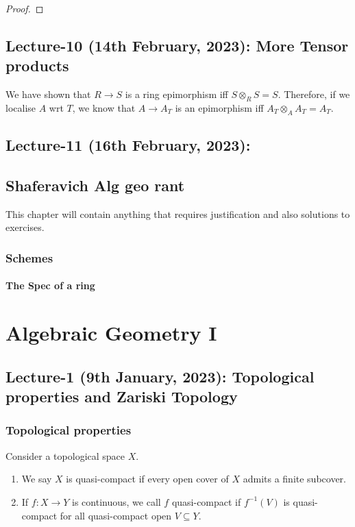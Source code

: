 \documentclass[oneside, 12pt]{scrbook}
\theoremstyle{theorem}
\begin{document}
\begin{proof}

\end{proof}

\chapter{Lecture-10 (14th February, 2023): More Tensor products}

We have shown that $R \rightarrow S$ is a ring epimorphism iff $S \otimes_{R} S = S$. Therefore, if we localise $A$ wrt $T$, we know that $A\rightarrow A_{T}$ is an epimorphism iff $A_{T} \otimes_{A} A_{T} = A_{T}$. 



\chapter{Lecture-11 (16th February, 2023): }





\chapter{Shaferavich Alg geo rant}
This chapter will contain anything that requires justification and also solutions to exercises. 
\section{Schemes}
\subsection{The Spec of a ring}





\part{Algebraic Geometry I}

\chapter{Lecture-1 (9th January, 2023): Topological properties and Zariski Topology}
\section{Topological properties}

Consider a topological space $X$. 
\begin{definition}
\begin{enumerate}
\item We say $X$ is quasi-compact if every open cover of $X$ admits a finite subcover. 
\item If $f: X \rightarrow Y$ is continuous, we call $f$ quasi-compact if $f^{-1}(V)$ is quasi-compact for all quasi-compact open $V \subseteq Y$.
\end{enumerate}
\end{definition} 
\end{document}
